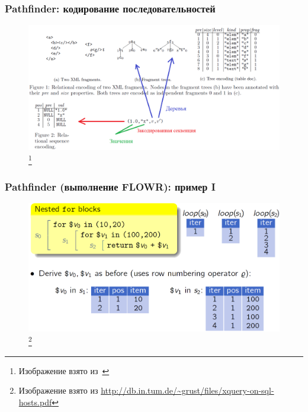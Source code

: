 \documentclass{beamer}
\begin{document}
\begin{frame}[t]
\frametitle{Pathfinder: кодирование последовательностей}

\begin{figure}[htb]
	\includegraphics[width=\textwidth,height=0.77\textheight,keepaspectratio]{pathfinder-coding.png} 
	\footnote{\tiny{Изображение взято из~\cite{Grust2004}}}
\end{figure}

\end{frame}

\begin{frame}[t]
\frametitle{Pathfinder (выполнение FLOWR): пример I}

\begin{figure}[htb]
\includegraphics[width=\textwidth,height=0.77\textheight,keepaspectratio]{pathfinder.png} 
\footnote{\tiny{Изображение взято из \url{http://db.in.tum.de/~grust/files/xquery-on-sql-hosts.pdf}}}
\end{figure}
  
\end{frame}
\end{document}
